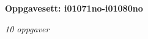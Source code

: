 \centerline{\bf Oppgavesett: i01071no-i01080no}
\vskip 10pt
\centerline{\it 10 oppgaver}\vskip 10pt
\vskip 10pt
